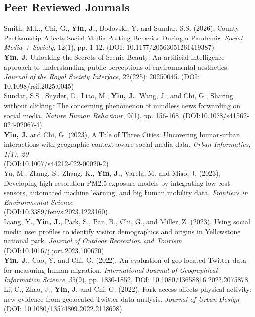 \documentclass[11pt, a4paper]{article}
\newcommand{\years}[1]{\marginnote{\scriptsize #1}}
\begin{document}
\subsection*{Peer Reviewed Journals}
\years{2026}Smith, M.L., Chi, G., \textbf{Yin, J.}, Bodovski, Y. and Sundar, S.S. (2026), County Partisanship Affects Social Media Posting Behavior During a Pandemic. \textit{Social Media + Society}, 12(1), pp. 1-12. (DOI: 10.1177/20563051261419387)\\
\years{2025}\textbf{Yin, J.} Unlocking the Secrets of Scenic Beauty:  An artificial intelligence approach to understanding public perceptions of environmental aesthetics. \textit{Journal of the Royal Society Interface}, 22(225): 20250045. (DOI: 10.1098/rsif.2025.0045)\\
\years{2025}Sundar, S.S., Snyder, E., Liao, M., \textbf{Yin, J.}, Wang, J., and Chi, G., Sharing without clicking: The concerning phenomenon of mindless news forwarding on social media. \textit{Nature Human Behaviour}, 9(1), pp. 156-168. (DOI:10.1038/s41562-024-02067-4)\\
\years{2023}\textbf{Yin, J.} and Chi, G. (2023), A Tale of Three Cities: Uncovering human-urban interactions with geographic-context aware social media data. \textit{Urban Informatics, 1(1), 20}\\(DOI:10.1007/s44212-022-00020-2)\\
\years{2023}Yu, M., Zhang, S., Zhang, K., \textbf{Yin, J.}, Varela, M. and Miao, J. (2023), Developing high-resolution PM2.5 exposure models by integrating low-cost sensors, automated machine learning, and big human mobility data. \textit{Frontiers in Environmental Science} \\(DOI:10.3389/fenvs.2023.1223160)\\
\years{2023}Liang, Y., \textbf{Yin, J.}, Park, S., Pan, B., Chi, G., and Miller, Z. (2023), Using social media user profiles to identify visitor demographics and origins in Yellowstone national park. \textit{Journal of Outdoor Recreation and Tourism} (DOI:10.1016/j.jort.2023.100620)\\
\years{2022}\textbf{Yin, J.}, Gao, Y. and Chi, G. (2022), An evaluation of geo-located Twitter data for measuring human migration. \textit{International Journal of Geographical Information Science}, 36(9), pp. 1830-1852, DOI: 10.1080/13658816.2022.2075878\\
\years{2022}Li, C., Zhao, J., \textbf{Yin, J.}  and Chi, G. (2022), Park access affects physical activity: new evidence from geolocated Twitter data analysis. \textit{Journal of Urban Design}\\(DOI: 10.1080/13574809.2022.2118698)\\
\end{document}
